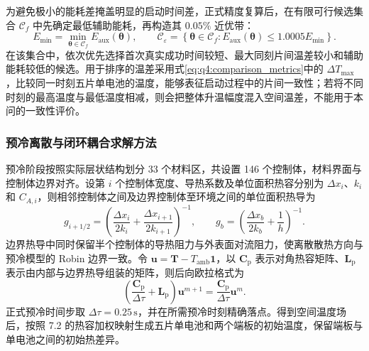 \documentclass[bwprint]{gmcmthesis}
\numberwithin{figure}{section}
\begin{document}
为避免极小的能耗差掩盖明显的启动时间差，正式精度复算后，在有限可行候选集合 \(\mathcal C_f\) 中先确定最低辅助能耗，再构造其 \(0.05\%\) 近优带：
\begin{equation}
E_{\min}=\min_{\boldsymbol{\theta}\in\mathcal C_f}E_{\mathrm{aux}}(\boldsymbol{\theta}),\qquad
\mathcal C_{\varepsilon}=\left\{\boldsymbol{\theta}\in\mathcal C_f:
E_{\mathrm{aux}}(\boldsymbol{\theta})\leq1.0005E_{\min}\right\}.
\tag{7-38}\label{eq:q4:solver_energy_band}
\end{equation}
在该集合中，依次优先选择首次真实成功时间较短、最大同刻片间温差较小和辅助能耗较低的候选。用于排序的温差采用式\eqref{eq:q4:comparison_metrics}中的 \(\Delta T_{\max}\)，比较同一时刻五片单电池的温度，能够表征启动过程中的片间一致性；若将不同时刻的最高温度与最低温度相减，则会把整体升温幅度混入空间温差，不能用于本问的一致性评价。

\subsubsection{预冷离散与闭环耦合求解方法}
预冷阶段按照实际层状结构划分 33 个材料区，共设置 146 个控制体，材料界面与控制体边界对齐。设第 \(i\) 个控制体宽度、导热系数及单位面积热容分别为 \(\Delta x_i\)、\(k_i\) 和 \(C_{A,i}\)，则相邻控制体之间及边界控制体至环境之间的单位面积热导为
\begin{equation}
g_{i+1/2}=\left(\frac{\Delta x_i}{2k_i}+\frac{\Delta x_{i+1}}{2k_{i+1}}\right)^{-1},\qquad
g_b=\left(\frac{\Delta x_b}{2k_b}+\frac{1}{h}\right)^{-1}.
\tag{7-39}\label{eq:q4:solver_precool_conductance}
\end{equation}
边界热导中同时保留半个控制体的导热阻力与外表面对流阻力，使离散散热方向与预冷模型的 Robin 边界一致。令 \(\boldsymbol{u}=\boldsymbol{T}-T_{\mathrm{amb}}\boldsymbol{1}\)，以 \(\mathbf C_{\mathrm p}\) 表示对角热容矩阵、\(\mathbf L_{\mathrm p}\) 表示由内部与边界热导组装的矩阵，则后向欧拉格式为
\begin{equation}
\left(\frac{\mathbf C_{\mathrm p}}{\Delta\tau}+\mathbf L_{\mathrm p}\right)
\boldsymbol{u}^{m+1}=\frac{\mathbf C_{\mathrm p}}{\Delta\tau}\boldsymbol{u}^{m}.
\tag{7-40}\label{eq:q4:solver_precool_be}
\end{equation}
正式预冷时间步取 \(\Delta\tau=0.25\,\mathrm s\)，并在所需预冷时刻精确落点。得到空间温度场后，按照 7.2 的热容加权映射生成五片单电池和两个端板的初始温度，保留端板与单电池之间的初始热差异。
\end{document}

